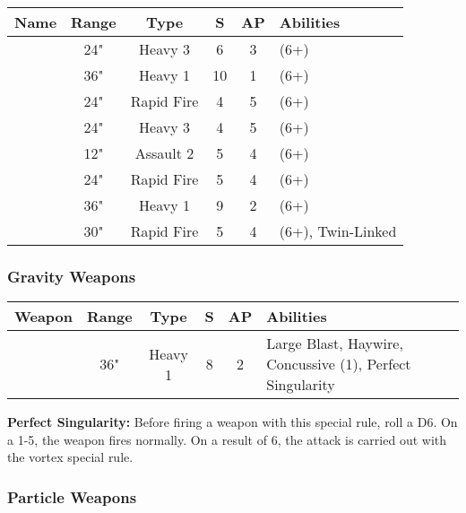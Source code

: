 \label{Gauss Cannon} \label{Gauss Destructor} \label{Gauss Blaster} \label{Gauss Flayer} \label{Gauss Flux Arcs} \label{Gauss Reaper} \label{Heavy Gauss Cannon} \label{Relic Gauss Blaster}
\noindent
\begin{NiceTabular}{m{130 pt} *{4}{c} >{\raggedright\arraybackslash}p{240pt}}
	Name & Range & Type & S & AP & Abilities \\
	\hline
	 & 24" & Heavy 3 & 6 & 3 &  (6+) \\
	  & 36" & Heavy 1 & 10 & 1 &   (6+) \\
	 & 24" & Rapid Fire & 4 & 5 &  (6+) \\
	  & 24" & Heavy 3 & 4 & 5 &  (6+) \\
	 & 12" & Assault 2 & 5 & 4 &  (6+) \\
	  & 24" & Rapid Fire & 5 & 4 &  (6+) \\
	 & 36" & Heavy 1 & 9 & 2 &  (6+) \\
	 & 30" & Rapid Fire & 5 & 4 &  (6+), Twin-Linked \\	
\end{NiceTabular}

\subsubsection{Gravity Weapons}

\label{Singulatiry Generator}
\begin{NiceTabular}{m{130 pt} *{4}{c} >{\raggedright\arraybackslash}p{240pt}}
	Weapon & Range & Type & S & AP & Abilities \\
	\hline
	 & 36" & Heavy 1 & 8 & 2 & Large Blast, Haywire, Concussive (1), Perfect Singularity  \\
\end{NiceTabular}

\vspace*{1em}
\textbf{Perfect Singularity:} Before firing a weapon with this special rule, roll a D6. On a 1-5, the weapon fires normally. On a result of 6, the attack is carried out with the vortex special rule.

\subsubsection{Particle Weapons}

